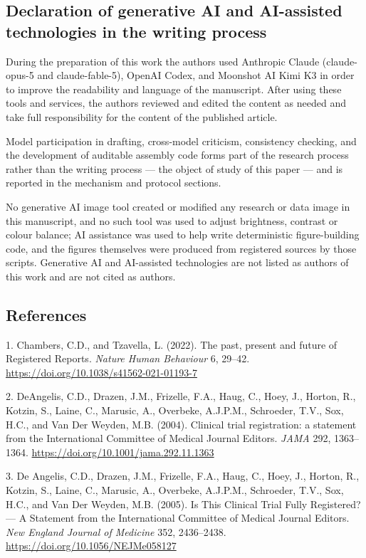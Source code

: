\documentclass[
  english,
]{article}
\begin{document}
\subsection{Declaration of generative AI and AI-assisted technologies in the writing process}\label{declaration-of-generative-ai-and-ai-assisted-technologies-in-the-writing-process}

During the preparation of this work the authors used Anthropic Claude (claude-opus-5 and claude-fable-5), OpenAI Codex, and Moonshot AI Kimi K3 in order to improve the readability and language of the manuscript. After using these tools and services, the authors reviewed and edited the content as needed and take full responsibility for the content of the published article.

Model participation in drafting, cross-model criticism, consistency checking, and the development of auditable assembly code forms part of the research process rather than the writing process --- the object of study of this paper --- and is reported in the mechanism and protocol sections.

No generative AI image tool created or modified any research or data image in this manuscript, and no such tool was used to adjust brightness, contrast or colour balance; AI assistance was used to help write deterministic figure-building code, and the figures themselves were produced from registered sources by those scripts. Generative AI and AI-assisted technologies are not listed as authors of this work and are not cited as authors.

\subsection{References}\label{references}

{1.} Chambers, C.D., and Tzavella, L. (2022). The past, present and future of Registered Reports. \emph{Nature Human Behaviour} 6, 29--42. \url{https://doi.org/10.1038/s41562-021-01193-7}

{2.} DeAngelis, C.D., Drazen, J.M., Frizelle, F.A., Haug, C., Hoey, J., Horton, R., Kotzin, S., Laine, C., Marusic, A., Overbeke, A.J.P.M., Schroeder, T.V., Sox, H.C., and Van Der Weyden, M.B. (2004). Clinical trial registration: a statement from the International Committee of Medical Journal Editors. \emph{JAMA} 292, 1363--1364. \url{https://doi.org/10.1001/jama.292.11.1363}

{3.} De Angelis, C.D., Drazen, J.M., Frizelle, F.A., Haug, C., Hoey, J., Horton, R., Kotzin, S., Laine, C., Marusic, A., Overbeke, A.J.P.M., Schroeder, T.V., Sox, H.C., and Van Der Weyden, M.B. (2005). Is This Clinical Trial Fully Registered? --- A Statement from the International Committee of Medical Journal Editors. \emph{New England Journal of Medicine} 352, 2436--2438. \url{https://doi.org/10.1056/NEJMe058127}
\end{document}
